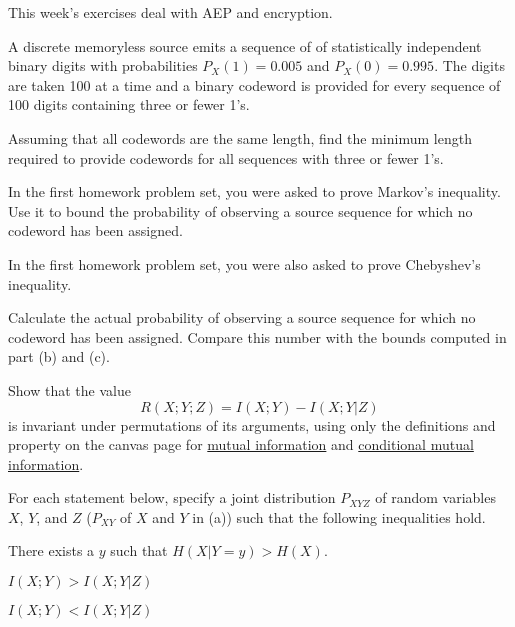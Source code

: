 \documentclass[a4paper,10pt,landscape,twocolumn]{scrartcl}
\begin{document}
\practiceproblems

{\sffamily\noindent
This week's exercises deal with AEP and encryption.  \practiceinstructions
}

\begin{exercise}
A discrete memoryless source emits a sequence of of statistically independent binary digits with probabilities $P_X(1) = 0.005$ and $P_X(0) = 0.995$. The digits are taken 100 at a time and a binary codeword is provided for every sequence of 100 digits containing three or fewer 1's.
	\begin{subex}
	Assuming that all codewords are the same length, find the minimum length required to
provide codewords for all sequences with three or fewer 1's.
	\end{subex}
	\begin{subex}
		In the first homework problem set, you were asked to prove Markov's inequality.
		Use it to bound the probability of observing a source sequence for
		which no codeword has been assigned.
	\end{subex}
    \begin{subex}
    	In the first homework problem set, you were also asked to prove Chebyshev's inequality.
	\begin{subex}
	Calculate the actual probability of observing a source sequence for which no codeword has
been assigned. Compare this number with the bounds computed
in part (b) and (c).
	\end{subex}
	\end{subex}
\end{exercise}



\begin{exercise}
Show that the value
\[
R(X;Y;Z) = I(X;Y) - I(X;Y|Z)
\]
is invariant under permutations of its arguments, using only the definitions and property on the canvas page for \href{https://canvas.uva.nl/courses/2205/pages/definition-mutual-information?module_item_id=17286}{mutual information} and \href{https://canvas.uva.nl/courses/2205/pages/definition-conditional-mutual-information?module_item_id=26474}{conditional mutual information}.
\end{exercise}

\begin{exercise}[]
For each statement below, specify a joint distribution $P_{XYZ}$ of random variables $X$, $Y$, and $Z$ ($P_{XY}$ of $X$ and $Y$ in (a)) such that the following inequalities hold.
\begin{subex}
There exists a $y$ such that $H(X|Y=y) > H(X)$.
\end{subex}
\begin{subex}
$I(X;Y) > I(X;Y|Z)$
\end{subex}
\begin{subex}
$I(X;Y) < I(X;Y|Z)$
\end{subex}
\end{exercise}
\end{document}
